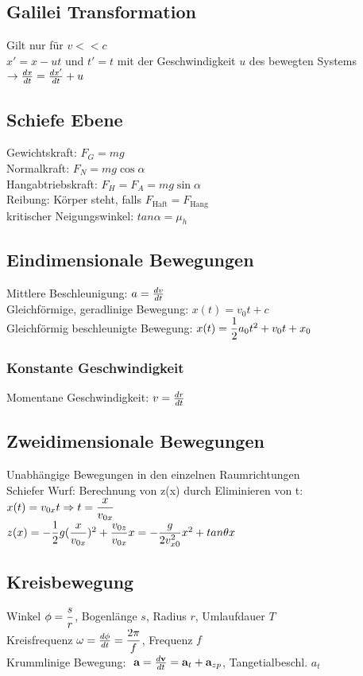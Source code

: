 \documentclass[fs, footer]{latex4ei}
\begin{document}
\begin{multicols*}{4}
\subsection{Galilei Transformation}
Gilt nur für $v<<c$\\
$x' = x - ut$ und $t' = t$ mit der Geschwindigkeit $u$ des bewegten Systems $\rightarrow \frac{dx}{dt} = \frac{dx'}{dt} + u$\\
\subsection{Schiefe Ebene}
Gewichtskraft: $F_G = mg$\\
Normalkraft: $F_N = mg\cos \alpha$\\
Hangabtriebskraft: $F_H = F_A = mg\sin \alpha$\\
Reibung: Körper steht, falls $F_{\text{Haft}} = F_{\text{Hang}}$\\
kritischer Neigungswinkel: $tan \alpha = \mu_h$\\

\subsection{Eindimensionale Bewegungen}
Mittlere Beschleunigung: $a = \frac{dv}{dt}$\\
Gleichförmige, geradlinige Bewegung: $x(t) = v_0t+c$\\
Gleichförmig beschleunigte Bewegung: $x(t) = \dfrac{1}{2}a_0t^2+v_0t+x_0$\\
\subsubsection{Konstante Geschwindigkeit}
Momentane Geschwindigkeit: $v = \frac{dr}{dt}$\\
\subsection{Zweidimensionale Bewegungen}
Unabhängige Bewegungen in den einzelnen Raumrichtungen\\
Schiefer Wurf:
Berechnung von z(x) durch Eliminieren von t: \\$x(t) = v_{0x}t \Rightarrow t = \dfrac{x}{v_{0x}}$\\
$z(x) = -\dfrac{1}{2}g(\dfrac{{x}}{v_{0x}})^2 + \dfrac{v_{0z}}{v_{0x}}x = -\dfrac{g}{2v^2_{x0}}x^2 + tan\theta x$\\
\subsection{Kreisbewegung}
Winkel $\phi = \dfrac{s}{r}$, 	Bogenlänge $s$, Radius $r$, Umlaufdauer $T$\\
Kreisfrequenz $\omega = \frac{d\phi}{dt} =\dfrac{2\pi}{f}$,	Frequenz $f$\\
Krummlinige Bewegung: $\ \textbf{a} = \frac{d\textbf{v}}{dt} = \textbf{a}_t + \textbf{a}_{zp}$,	Tangetialbeschl. $a_t$\\

\end{multicols*}
\end{document}
